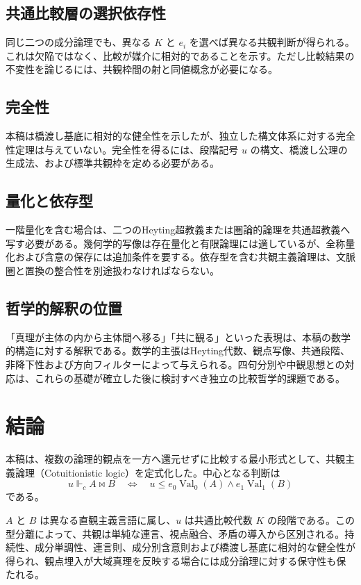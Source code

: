 \documentclass[a4paper,11pt]{ltjsarticle}
\theoremstyle{definition}
\theoremstyle{plain}
\newcommand{\Val}{\operatorname{Val}}
\newcommand{\forcesc}{\Vdash_{\!c}}
\begin{document}
\subsection{共通比較層の選択依存性}

同じ二つの成分論理でも、異なる $K$ と $e_i$ を選べば異なる共観判断が得られる。これは欠陥ではなく、比較が媒介に相対的であることを示す。ただし比較結果の不変性を論じるには、共観枠間の射と同値概念が必要になる。

\subsection{完全性}

本稿は橋渡し基底に相対的な健全性を示したが、独立した構文体系に対する完全性定理は与えていない。完全性を得るには、段階記号 $u$ の構文、橋渡し公理の生成法、および標準共観枠を定める必要がある。

\subsection{量化と依存型}

一階量化を含む場合は、二つのHeyting超教義または圏論的論理を共通超教義へ写す必要がある。幾何学的写像は存在量化と有限論理には適しているが、全称量化および含意の保存には追加条件を要する。依存型を含む共観主義論理は、文脈圏と置換の整合性を別途扱わなければならない。

\subsection{哲学的解釈の位置}

「真理が主体の内から主体間へ移る」「共に観る」といった表現は、本稿の数学的構造に対する解釈である。数学的主張はHeyting代数、観点写像、共通段階、非降下性および方向フィルターによって与えられる。四句分別や中観思想との対応は、これらの基礎が確立した後に検討すべき独立の比較哲学的課題である\cite{Garfield1995,Westerhoff2009}。

\section{結論}

本稿は、複数の論理的観点を一方へ還元せずに比較する最小形式として、共観主義論理（Cotuitionistic logic）を定式化した。中心となる判断は
\[
 \boxed{
 u\forcesc A\bowtie B
 \quad\Longleftrightarrow\quad
 u\leq e_0\Val_0(A)\wedge e_1\Val_1(B)
 }
\]
である。

$A$ と $B$ は異なる直観主義言語に属し、$u$ は共通比較代数 $K$ の段階である。この型分離によって、共観は単純な連言、視点融合、矛盾の導入から区別される。持続性、成分単調性、連言則、成分別含意則および橋渡し基底に相対的な健全性が得られ、観点埋入が大域真理を反映する場合には成分論理に対する保守性も保たれる。
\end{document}
